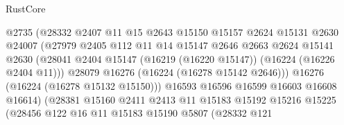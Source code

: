 \begin{lexlean}{RustCore}
\begin{coremodule}
                                    @2735
                                    (@28332
                                      @2407
                                      @11
                                      @15
                                      @2643
                                      @15150
                                      @15157
                                      @2624
                                      @15131
                                      @2630
                                      @24007
                                      (@27979
                                        @2405
                                        @112
                                        @11
                                        @14
                                        @15147
                                        @2646
                                        @2663
                                        @2624
                                        @15141
                                        @2630
                                        (@28041
                                          @2404
                                          @15147
                                          (@16219 (@16220 @15147))
                                          (@16224 (@16226 @2404 @11)))
                                        @28079
                                        @16276
                                        (@16224 (@16278 @15142 @2646)))
                                      @16276
                                      (@16224 (@16278 @15132 @15150)))
                                    @16593
                                    @16596
                                    @16599
                                    @16603
                                    @16608
                                    @16614)
                                  (@28381
                                    @15160
                                    @2411
                                    @2413
                                    @11
                                    @15183
                                    @15192
                                    @15216
                                    @15225
                                    (@28456
                                      @122
                                      @16
                                      @11
                                      @15183
                                      @15190
                                      @5807
                                      (@28332
                                        @121

\end{coremodule}
\end{lexlean}
